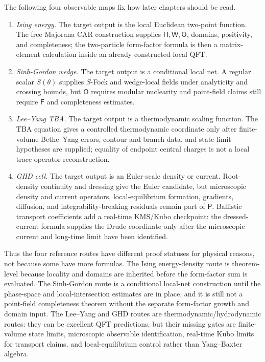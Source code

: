 \begin{remark}
The following four observable maps fix how later chapters should be read.
\begin{enumerate}[label=\textnormal{(\alph*)}]
\item \emph{Ising energy.}  The target output is the local Euclidean
two-point function.  The free Majorana CAR construction supplies
\(\mathsf H,\mathsf W,\mathsf O\), domains, positivity, and completeness; the
two-particle form-factor formula is then a matrix-element calculation inside an
already constructed local QFT.
\item \emph{Sinh-Gordon wedge.}  The target output is a conditional local
net.  A regular scalar \(S(\theta)\) supplies \(S\)-Fock and wedge-local fields
under analyticity and crossing bounds, but \(\mathsf O\) requires modular
nuclearity and point-field claims still require \(\mathsf F\) and completeness
estimates.
\item \emph{Lee--Yang TBA.}  The target output is a thermodynamic scaling
function.  The TBA equation gives a controlled thermodynamic coordinate only
after finite-volume Bethe--Yang errors, contour and branch data, and state-limit
hypotheses are supplied; equality of endpoint central charges is not a local
trace-operator reconstruction.
\item \emph{GHD cell.}  The target output is an Euler-scale density or
current.  Root-density continuity and dressing give the Euler candidate, but
microscopic density and current operators, local-equilibrium formation,
gradients, diffusion, and integrability-breaking residuals remain part of
\(\mathsf P\).  Ballistic transport coefficients add a real-time KMS/Kubo
checkpoint: the dressed-current formula supplies the Drude coordinate only after the
microscopic current and long-time limit have been identified.
\end{enumerate}

Thus the four reference routes have different proof statuses for physical
reasons, not because some have more formulas.  The Ising energy-density route is
theorem-level because locality and domains are inherited before the form-factor
sum is evaluated.  The Sinh-Gordon route is a conditional local-net
construction until the phase-space and local-intersection estimates are in
place, and it is still not a point-field completeness theorem without the
separate form-factor growth and domain input.  The Lee--Yang and GHD routes are
thermodynamic/hydrodynamic routes: they can be excellent QFT predictions, but
their missing gates are finite-volume state limits, microscopic observable
identification, real-time Kubo limits for transport claims, and
local-equilibrium control rather than Yang--Baxter algebra.


\end{remark}
